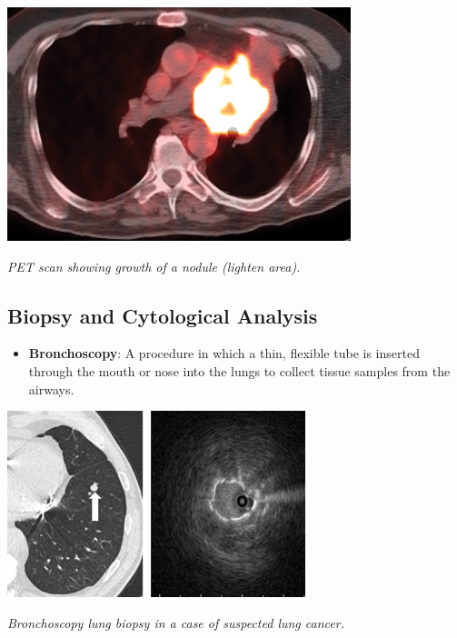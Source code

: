 \vspace{1em}
\begin{center}
    \includegraphics[width=0.75\textwidth]{../assets/04-diagnosis/lc-pet.jpeg}

    \small\textit{PET scan showing growth of a nodule (lighten area). 
    \cite{doi:10.2214/AJR.16.16532}}
\end{center}
\vspace{1em}


\subsection{Biopsy and Cytological Analysis}

\begin{itemize}
    \item \textbf{Bronchoscopy}: A procedure in which a thin, flexible tube is inserted through the 
    mouth or nose into the lungs to collect tissue samples from the airways.
\end{itemize}

\vspace{1em}
\begin{center}
    \includegraphics[width=0.65\textwidth]{../assets/04-diagnosis/lc-bronchoscopy.jpg}

    \small\textit{Bronchoscopy lung biopsy in a case of suspected lung cancer. 
    \cite{haas2018bronchoscopic}}
\end{center}
\vspace{1em}

